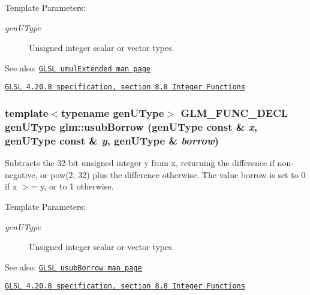 \begin{Desc}
\item[Template Parameters:]
\begin{description}
\item[{\em genUType}]Unsigned integer scalar or vector types.\end{description}
\end{Desc}
\begin{Desc}
\item[See also:]\href{http://www.opengl.org/sdk/docs/manglsl/xhtml/umulExtended.xml}{\tt GLSL umulExtended man page} 

\href{http://www.opengl.org/registry/doc/GLSLangSpec.4.20.8.pdf}{\tt GLSL 4.20.8 specification, section 8.8 Integer Functions} \end{Desc}
\hypertarget{group__core__func__integer_ge13e6c290847ba577bdd0b82b2527ce2}{
\subsubsection[usubBorrow]{\setlength{\rightskip}{0pt plus 5cm}template$<$typename genUType$>$ GLM\_\-FUNC\_\-DECL genUType glm::usubBorrow (genUType const \& {\em x}, \/  genUType const \& {\em y}, \/  genUType \& {\em borrow})}}
\label{group__core__func__integer_ge13e6c290847ba577bdd0b82b2527ce2}


Subtracts the 32-bit unsigned integer y from x, returning the difference if non-negative, or pow(2, 32) plus the difference otherwise. The value borrow is set to 0 if x $>$= y, or to 1 otherwise.

\begin{Desc}
\item[Template Parameters:]
\begin{description}
\item[{\em genUType}]Unsigned integer scalar or vector types.\end{description}
\end{Desc}
\begin{Desc}
\item[See also:]\href{http://www.opengl.org/sdk/docs/manglsl/xhtml/usubBorrow.xml}{\tt GLSL usubBorrow man page} 

\href{http://www.opengl.org/registry/doc/GLSLangSpec.4.20.8.pdf}{\tt GLSL 4.20.8 specification, section 8.8 Integer Functions} \end{Desc}

